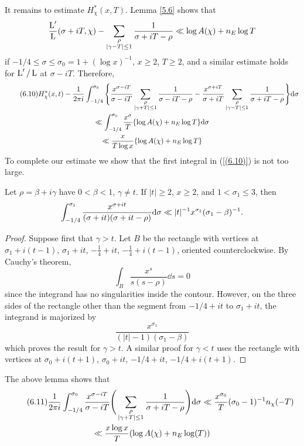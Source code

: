 \documentclass[./main]{subfiles}
\begin{document}
It remains to estimate $H_{\chi}^{*}(x,T)$. Lemma \ref{5.6} shows that 
\[\frac{\operatorname{L}'}{\operatorname{L}}(\sigma + iT, \chi) - \sum_{\substack{\rho \\ |\gamma - T| \leq 1}} \frac{1}{\sigma + iT - \rho} \ll \log A(\chi) + n_E \log T
\]
if $-1/4 \leq \sigma \leq \sigma_0 = 1 + (\log x)^{-1}$, $x \geq 2$, $T \geq 2$, and a similar estimate holds for $\operatorname{L}'/\operatorname{L}$ at $\sigma - iT$. Therefore, 
\begin{multline}\tag{6.10}\label{(6.10)}
    H_{\chi}^{*}(x,t) - \frac{1}{2\pi i} \int_{-1/4}^{\sigma_0} \Bigg\{ \frac{x^{\sigma - iT}}{\sigma - iT} \sum_{\substack{\rho \\ |\gamma +  T| \leq 1 }} \frac{1}{\sigma - iT -\rho} - \frac{x^{\sigma + iT}}{\sigma + iT} \sum_{\substack{\rho \\ |\gamma - T| \leq 1}} \frac{1}{\sigma + iT - \rho}\Bigg\} \mathrm{d}{\sigma} \\
    \ll \int_{-1/4}^{\sigma_0} \frac{x^{\sigma}}{T} \{ \log A(\chi) + n_E \log T \} \mathrm{d}{\sigma} \\\ll \frac{x}{T\log x} \{\log A(\chi) + n_E \log T\}
\end{multline}
To complete our estimate we show that the first integral in (\ref{(6.10)}) is not too large. 
\begin{lemma}\label{6.3}
Let $\rho = \beta + i \gamma$ have $0 < \beta < 1$, $\gamma \neq t$. If $|t| \geq 2$, $x \geq 2$, and $1 < \sigma_1 \leq 3$, then 
\[ \int_{-1/4}^{\sigma_1} \frac{x^{\sigma + it}}{(\sigma + it) (\sigma + it - \rho)} \mathrm{d}{\sigma} \ll |t|^{-1}x^{\sigma_1}(\sigma_1 - \beta)^{-1}.
\]
\end{lemma}
\begin{proof}
Suppose first that $\gamma > t$. Let $B$ be the rectangle with vertices at \\ $\sigma_1 + i(t-1)$, $\sigma_1 + it$, $-\frac{1}{4}+it$, $-\frac{1}{4} + i(t-1)$, oriented counterclockwise. By Cauchy's theorem, 
\[ \int_{B} \frac{x^s}{s(s-\rho)} \dd{s} = 0
\]
since the integrand has no singularities inside the contour. However, on the three sides of the rectangle other than the segment from $-1/4 + it$ to $\sigma_1 + it$, the integrand is majorized by 
\[ \frac{x^{\sigma_1}}{(|t| - 1)(\sigma_1 - \beta)}
\]
which proves the result for $\gamma > t$. A similar proof for $\gamma < t$ uses the rectangle with vertices at $\sigma_0 + i(t+1)$, $\sigma_0 + it$, $-1/4 + it$, $-1/4 + i(t+1)$.
\end{proof}
The above lemma shows that 
\begin{multline}\tag{6.11}\label{(6.11)} \frac{1}{2\pi i} \int_{-1/4}^{\sigma_0} \frac{x^{\sigma - iT}}{\sigma - iT} \Bigg(\sum_{\substack{\rho \\ |\gamma + T| \leq 1}} \frac{1}{\sigma + iT - \rho}\Bigg) \mathrm{d}{\sigma} \ll \frac{x^{\sigma_0}}{T}(\sigma_0 - 1)^{-1} n_{\chi}(-T) \\ \ll \frac{x \log x}{T}(\log A(\chi) + n_E \log(T))
\end{multline}
\end{document}

